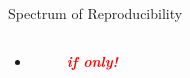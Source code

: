 \documentclass[xcolor=svgnames,11pt]{beamer}
\begin{document}
\begin{frame}{Spectrum of Reproducibility}
\begin{columns}[t]
\begin{column}[t]{0.5\textwidth}
    \begin{itemize}
      \item[]  \textcolor{white}{-----} 
         \textcolor{white}{-} \textcolor{red}{\textbf{\emph{if only!}}}
    \end{itemize}

  \end{column}
\end{columns}

\vspace{1cm}

\end{frame}
\end{document}
